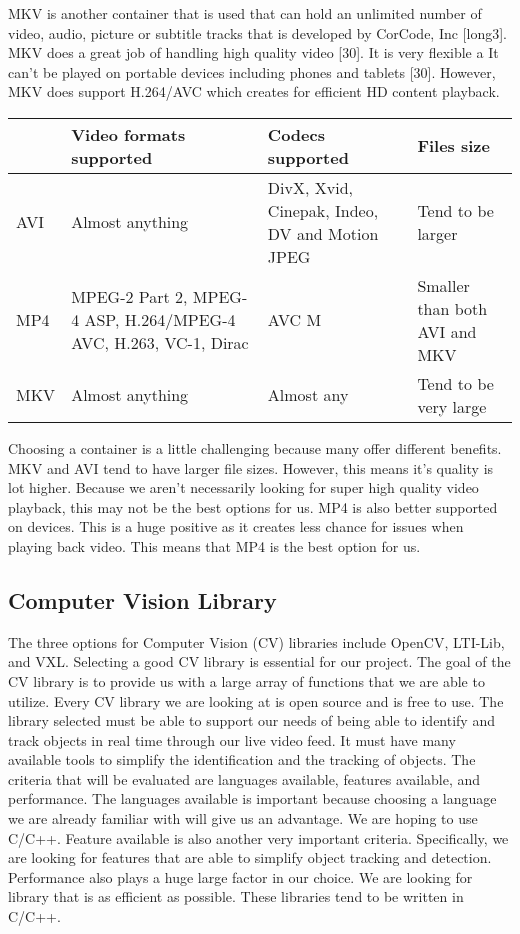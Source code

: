 \documentclass[letterpaper,10pt,onecolumn,draftclsnofoot]{IEEEtran}
\begin{document}
MKV is another container that is used that can hold an unlimited number of video, audio, picture or subtitle tracks  that is developed by CorCode, Inc [long3].
MKV does a great job of handling high quality video [30].
It is very flexible a
It can't be played on portable devices including phones and tablets [30].
However, MKV does support H.264/AVC which creates for efficient HD content playback.

\begin{center}
	\begin{tabular}{|p{2cm}|p{5cm}|p{4cm}|p{4cm}|}
		
		\hline
		\textbf{} & \textbf{Video formats supported} & \textbf{Codecs supported} & \textbf{Files size} \\
		\hline
		AVI & Almost anything & DivX, Xvid, Cinepak, Indeo, DV and Motion JPEG & Tend to be larger \\
		\hline
		MP4 & MPEG-2 Part 2, MPEG-4 ASP, H.264/MPEG-4 AVC, H.263, VC-1, Dirac & AVC M & Smaller than both AVI and MKV \\
		\hline
		MKV & Almost anything & Almost any & Tend to be very large \\
		\hline
		
	\end{tabular}
\end{center}

Choosing a container is a little challenging because many offer different benefits.
MKV and AVI tend to have larger file sizes.
However, this means it's quality is lot higher.
Because we aren't necessarily looking for super high quality video playback, this may not be the best options for us.
MP4 is also better supported on devices.
This is a huge positive as it creates less chance for issues when playing back video.
This means that MP4 is the best option for us.


\newpage
\subsection{Computer Vision Library} %
The three options for Computer Vision (CV) libraries include OpenCV, LTI-Lib, and VXL.
Selecting a good CV library is essential for our project.
The goal of the CV library is to provide us with a large array of functions that we are able to utilize.
Every CV library we are looking at is open source and is free to use.
The library selected must be able to support our needs of being able to identify and track objects in real time through our live video feed.
It must have many available tools to simplify the identification and the tracking of objects.
The criteria that will be evaluated are languages available, features available, and performance.
The languages available is important because choosing a language we are already familiar with will give us an advantage.
We are hoping to use C/C++.
Feature available is also another very important criteria.
Specifically, we are looking for features that are able to simplify object tracking and detection.
Performance also plays a huge large factor in our choice.
We are looking for library that is as efficient as possible.
These libraries tend to be written in C/C++.
\end{document}
